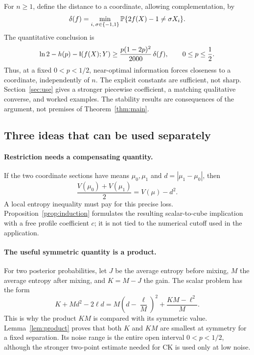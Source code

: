 For $n\ge1$, define the distance to a coordinate, allowing complementation, by
\begin{equation}\label{eq:delta-intro}
 \delta(f)=\min_{i,\,\sigma\in\{-1,1\}}\mathbb P\{2f(X)-1\ne\sigma X_i\}.
\end{equation}
The quantitative conclusion is
\begin{equation}\label{eq:stability-overview}
\ln2-h(p)-\mathsf I(f(X);Y)
\ge \frac{p(1-2p)^2}{2000}\,\delta(f),
\qquad 0\le p\le\frac12.
\end{equation}
Thus, at a fixed $0<p<1/2$, near-optimal information forces closeness to a coordinate, independently of $n$. The explicit constants are sufficient, not sharp. Section~\ref{sec:use} gives a stronger piecewise coefficient, a matching qualitative converse, and worked examples. The stability results are consequences of the argument, not premises of Theorem~\ref{thm:main}.

\subsection{Three ideas that can be used separately}
\paragraph{Restriction needs a compensating quantity.}
If the two coordinate sections have means $\mu_0,\mu_1$ and $d=|\mu_1-\mu_0|$, then
\[
 \frac{V(\mu_0)+V(\mu_1)}2=V(\mu)-d^2.
\]
A local entropy inequality must pay for this precise loss. Proposition~\ref{prop:induction} formulates the resulting scalar-to-cube implication with a free profile coefficient $c$; it is not tied to the numerical cutoff used in the application.

\paragraph{The useful symmetric quantity is a product.}
For two posterior probabilities, let $J$ be the average entropy before mixing, $M$ the average entropy after mixing, and $K=M-J$ the gain. The scalar problem has the form
\[
 K+Md^2-2\ell d
 =M\left(d-\frac{\ell}{M}\right)^2+\frac{KM-\ell^2}{M}.
\]
This is why the product $KM$ is compared with its symmetric value. Lemma~\ref{lem:product} proves that both $K$ and $KM$ are smallest at symmetry for a fixed separation. Its noise range is the entire open interval $0<p<1/2$, although the stronger two-point estimate needed for CK is used only at low noise.


